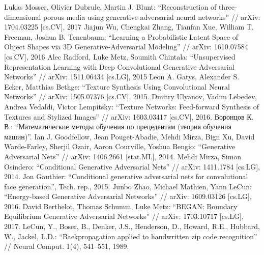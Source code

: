 \documentclass[a4paper]{article}
\begin{document}
	
	\setcounter{page}{2}
	\tableofcontents
	
	
	
	
	
	
	
	\clearpage
	\begin{thebibliography}{99}
		 Lukas Mosser, Olivier Dubrule, Martin J. Blunt: ``Reconstruction of three-dimensional porous media using generative adversarial neural networks'' // arXiv: 1704.03225 [cs.CV], 2017
		 Jiajun Wu, Chengkai Zhang, Tianfan Xue, William T. Freeman, Joshua B. Tenenbaum: ``Learning a Probabilistic Latent Space of Object Shapes via 3D Generative-Adversarial Modeling'' // arXiv: 1610.07584 [cs.CV], 2016
		 Alec Radford, Luke Metz, Soumith Chintala: ``Unsupervised Representation Learning with Deep Convolutional Generative Adversarial Networks'' // arXiv: 1511.06434 [cs.LG], 2015
		 Leon A. Gatys, Alexander S. Ecker, Matthias Bethge: ``Texture Synthesis Using Convolutional Neural Networks'' // arXiv: 1505.07376 [cs.CV], 2015.
		 Dmitry Ulyanov, Vadim Lebedev, Andrea Vedaldi, Victor Lempitsky: ``Texture Networks: Feed-forward Synthesis of Textures and Stylized Images'' // arXiv: 1603.03417 [cs.CV], 2016.
		  Воронцов К. В.: ``Математические методы обучения по прецедентам (теория обучения машин)''.
		 Ian J. Goodfellow, Jean Pouget-Abadie, Mehdi Mirza, Bign Xu, David Warde-Farley, Sherjil Ozair, Aaron Courville, Yoshua Bengio: ``Generative Adversarial Nets'' // arXiv: 1406.2661 [stat.ML], 2014.
		 Mehdi Mirza, Simon Osindero: ``Conditional Generative Adversarial Nets'' // arXiv: 1411.1784 [cs.LG], 2014.
		 Jon Gauthier: ``Conditional generative adversarial nets for convolutional face generation'', Tech. rep., 2015.
		 Junbo Zhao, Michael Mathien, Yann LeCun: ``Energy-based Generative Adversarial Networks'' // arXiv: 1609.03126 [cs.LG], 2016.
		 David Berthelot, Thomas Schumm, Luke Metz: ``BEGAN: Boundary Equilibrium Generative Adversarial Networks'' // arXiv: 1703.10717 [cs.LG], 2017.
		 LeCun, Y., Boser, B., Denker, J.S., Henderson, D., Howard, R.E., Hubbard, W., Jackel, L.D.: ``Backpropagation applied to handwritten zip code recognition'' // Neural Comput. 1(4), 541–551, 1989.

\end{thebibliography}
\end{document}
